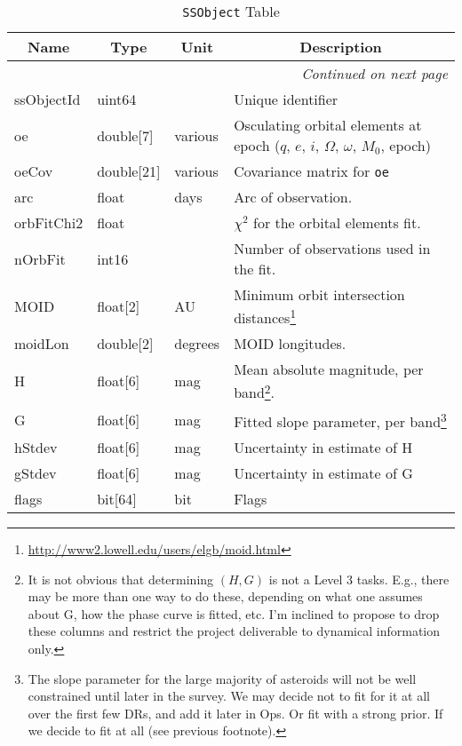 \documentclass[12pt]{article}
\newcommand{\code}[1]{\texttt{#1}}
\newcommand{\SSObject}{\code{SSObject}\xspace}
\begin{document}
\begin{center}
\begin{longtable}{p{3cm}p{2cm}p{2cm}p{5cm}}
\caption[\SSObject Table]{\SSObject Table} \\

\hline \multicolumn{1}{c}{\bf Name} & \multicolumn{1}{c}{\bf Type} & \multicolumn{1}{c}{\bf Unit} & \multicolumn{1}{c}{\bf Description} \\ \hline
\endhead

\hline \multicolumn{4}{r}{{\em Continued on next page}} \\
\endfoot

\hline\hline
\endlastfoot

ssObjectId & uint64 & ~ & Unique identifier \\ 

oe & double[7] & various & Osculating orbital elements at epoch ($q$, $e$, $i$, $\Omega$, $\omega$, $M_0$, epoch) \\

oeCov & double[21] & various & Covariance matrix for \texttt{oe} \\

arc & float & days & Arc of observation. \\

orbFitChi2 & float & ~ & $\chi^2$ for the orbital elements fit. \\

nOrbFit & int16 & ~ & Number of observations used in the fit. \\

MOID & float[2] & AU & Minimum orbit intersection distances\footnote{\url{http://www2.lowell.edu/users/elgb/moid.html}} \\

moidLon & double[2] & degrees & MOID longitudes. \\

H & float[6] & mag & Mean absolute magnitude, per band\footnote{It is not obvious that determining $(H,G)$ is not a Level 3 tasks. E.g., there may be more than one way to do these, depending on what one assumes about G, how the phase curve is fitted, etc. I'm inclined to propose to drop these columns and restrict the project deliverable to dynamical information only.}. \\

G & float[6] & mag & Fitted slope parameter, per band\footnote{The slope parameter for the large majority of asteroids will not be well constrained until later in the survey. We may decide not to fit for it at all over the first few DRs, and add it later in Ops. Or fit with a strong prior. If we decide to fit at all (see previous footnote).} \\

hStdev & float[6] & mag & Uncertainty in estimate of H \\

gStdev & float[6] & mag & Uncertainty in estimate of G \\

flags & bit[64] & bit & Flags \\ \hline

\end{longtable}
\end{center}
\end{document}
